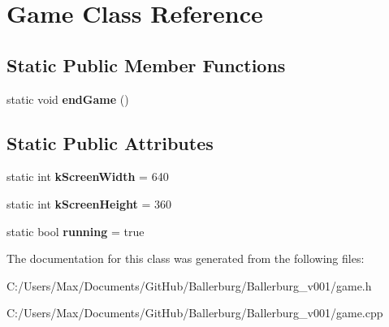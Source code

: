\section{Game Class Reference}
\label{class_game}
\subsection*{Static Public Member Functions}
\begin{DoxyCompactItemize}
\item 
static void {\bfseries end\+Game} ()\label{class_game_a1dd53b1421401d56b123448b3009ec42}

\end{DoxyCompactItemize}
\subsection*{Static Public Attributes}
\begin{DoxyCompactItemize}
\item 
static int {\bfseries k\+Screen\+Width} = 640\label{class_game_a5cd5507c48083efe21870edc010b0092}

\item 
static int {\bfseries k\+Screen\+Height} = 360\label{class_game_a987ce043b9c2dca54691ddc4146b6411}

\item 
static bool {\bfseries running} = true\label{class_game_a8ca5b9f8a62990e6022de17785beac2c}

\end{DoxyCompactItemize}


The documentation for this class was generated from the following files\+:\begin{DoxyCompactItemize}
\item 
C\+:/\+Users/\+Max/\+Documents/\+Git\+Hub/\+Ballerburg/\+Ballerburg\+\_\+v001/game.\+h\item 
C\+:/\+Users/\+Max/\+Documents/\+Git\+Hub/\+Ballerburg/\+Ballerburg\+\_\+v001/game.\+cpp\end{DoxyCompactItemize}
